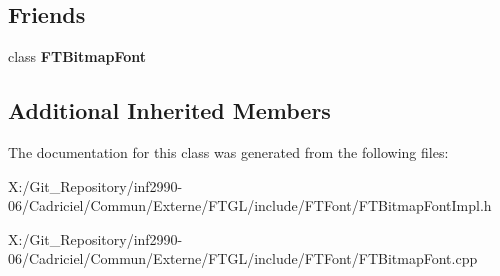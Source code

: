 \subsection*{Friends}
\begin{DoxyCompactItemize}
\item 
\hypertarget{class_f_t_bitmap_font_impl_a7ba5a198d501799828a37b4b808b9352}{class {\bfseries F\-T\-Bitmap\-Font}}\label{class_f_t_bitmap_font_impl_a7ba5a198d501799828a37b4b808b9352}

\end{DoxyCompactItemize}
\subsection*{Additional Inherited Members}


The documentation for this class was generated from the following files\-:\begin{DoxyCompactItemize}
\item 
X\-:/\-Git\-\_\-\-Repository/inf2990-\/06/\-Cadriciel/\-Commun/\-Externe/\-F\-T\-G\-L/include/\-F\-T\-Font/F\-T\-Bitmap\-Font\-Impl.\-h\item 
X\-:/\-Git\-\_\-\-Repository/inf2990-\/06/\-Cadriciel/\-Commun/\-Externe/\-F\-T\-G\-L/include/\-F\-T\-Font/F\-T\-Bitmap\-Font.\-cpp\end{DoxyCompactItemize}
